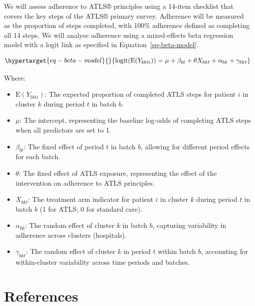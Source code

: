 \documentclass[
]{scrartcl}
\providecommand{\tightlist}{%
  \setlength{\itemsep}{0pt}\setlength{\parskip}{0pt}}\usepackage{longtable,booktabs,array}
\begin{document}
We will assess adherence to ATLS® principles using a 14-item checklist
that covers the key steps of the ATLS® primary survey. Adherence will be
measured as the proportion of steps completed, with 100\% adherence
defined as completing all 14 steps. We will analyse adherence using a
mixed-effects beta regression model with a logit link as specified in
Equation~\ref{eq-beta-model}.

\begin{equation}\protect\hypertarget{eq-beta-model}{}{
\text{logit}(\text{E}(Y_{bkti})) = \mu + \beta_{bt} + \theta X_{bkt} + \alpha_{bk} + \gamma_{bkt}
}\label{eq-beta-model}\end{equation}

Where:

\begin{itemize}
\tightlist
\item
  \(\text{E}(Y_{bkti})\): The expected proportion of completed ATLS
  steps for patient \(i\) in cluster \(k\) during period \(t\) in batch
  \(b\).
\item
  \(\mu\): The intercept, representing the baseline log-odds of
  completing ATLS steps when all predictors are set to 1.
\item
  \(\beta_{bt}\): The fixed effect of period \(t\) in batch \(b\),
  allowing for different period effects for each batch.
\item
  \(\theta\): The fixed effect of ATLS exposure, representing the effect
  of the intervention on adherence to ATLS principles.
\item
  \(X_{bkt}\): The treatment arm indicator for patient \(i\) in cluster
  \(k\) during period \(t\) in batch \(b\) (1 for ATLS, 0 for standard
  care).
\item
  \(\alpha_{bk}\): The random effect of cluster \(k\) in batch \(b\),
  capturing variability in adherence across clusters (hospitals).
\item
  \(\gamma_{bkt}\): The random effect of cluster \(k\) in period \(t\)
  within batch \(b\), accounting for within-cluster variability across
  time periods and batches.
\end{itemize}

\hypertarget{references}{%
\section*{References}\label{references}}
\end{document}
